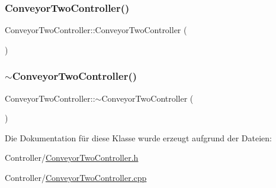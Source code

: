 \subsubsection{\texorpdfstring{Conveyor\+Two\+Controller()}{ConveyorTwoController()}}
{\footnotesize\ttfamily Conveyor\+Two\+Controller\+::\+Conveyor\+Two\+Controller (\begin{DoxyParamCaption}{ }\end{DoxyParamCaption})}

\hypertarget{class_conveyor_two_controller_a7b2d996e62a8467455279ce295b5c889}{}\label{class_conveyor_two_controller_a7b2d996e62a8467455279ce295b5c889} 
\subsubsection{\texorpdfstring{$\sim$\+Conveyor\+Two\+Controller()}{~ConveyorTwoController()}}
{\footnotesize\ttfamily Conveyor\+Two\+Controller\+::$\sim$\+Conveyor\+Two\+Controller (\begin{DoxyParamCaption}{ }\end{DoxyParamCaption})\hspace{0.3cm}{\ttfamily [virtual]}}



Die Dokumentation für diese Klasse wurde erzeugt aufgrund der Dateien\+:\begin{DoxyCompactItemize}
\item 
Controller/\hyperlink{_conveyor_two_controller_8h}{Conveyor\+Two\+Controller.\+h}\item 
Controller/\hyperlink{_conveyor_two_controller_8cpp}{Conveyor\+Two\+Controller.\+cpp}\end{DoxyCompactItemize}

